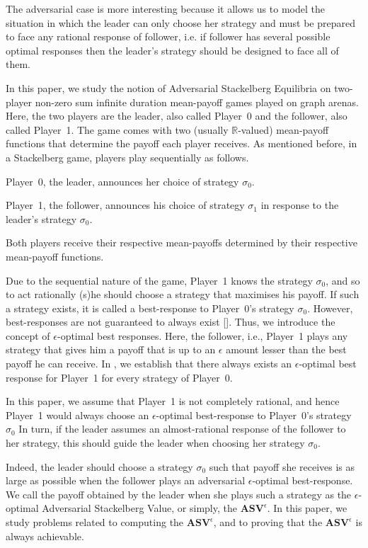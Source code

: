 The adversarial case is more interesting because it allows us to model the situation in which the leader can only choose her strategy and must be prepared to face any rational response of follower, i.e. if follower has several possible optimal responses then the leader's strategy should be designed to face all of them.

In this paper, we study the notion of Adversarial Stackelberg Equilibria on two-player non-zero sum infinite duration mean-payoff games played on graph arenas. Here, the two players are the leader, also called Player~0 and the follower, also called Player~1. The game comes with two (usually $\mathbb{R}$-valued) mean-payoff functions that determine the payoff each player receives. As mentioned before, in a Stackelberg game, players play sequentially as follows.
\begin{inparaenum}[(i)]
\item Player~0, the leader, announces her choice of strategy $\sigma_0$. 
\item Player~1, the follower, announces his choice of strategy $\sigma_1$ in response to the leader's strategy $\sigma_0$. 
\item Both players receive their respective mean-payoffs determined by their respective mean-payoff functions.
\end{inparaenum}
Due to the sequential nature of the game, Player~1 knows the strategy $\sigma_0$, and so to act rationally (s)he should choose a strategy that maximises his payoff. If such a strategy exists, it is called a best-response to Player~0's strategy $\sigma_0$. However, best-responses are not guaranteed to always exist [\cite{FGR20}]. Thus, we introduce the concept of $\epsilon$-optimal best responses. Here, the follower, i.e., Player~1  plays any strategy that gives him a payoff that is up to an $\epsilon$ amount lesser than the best payoff he can receive. In \cite{FGR20}, we establish that there always exists an $\epsilon$-optimal best response for Player~1 for every strategy of Player~0. 

In this paper, we assume that Player~1 is not completely rational, and hence Player~1 would always choose an $\epsilon$-optimal best-response to Player~0's strategy $\sigma_0$
In turn, if the leader assumes an almost-rational response of the follower to her strategy, this should guide the leader when choosing her strategy $\sigma_0$.

Indeed, the leader should choose a strategy $\sigma_0 $ such that payoff she receives is as large as possible when the follower plays an adversarial $\epsilon$-optimal best-response. We call the payoff obtained by the leader when she plays such a strategy as the $\epsilon$-optimal Adversarial Stackelberg Value, or simply, the $\mathbf{ASV}^{\epsilon}$. In this paper, we study problems related to computing the $\mathbf{ASV}^{\epsilon}$, and to proving that the $\mathbf{ASV}^{\epsilon}$ is always achievable. 

